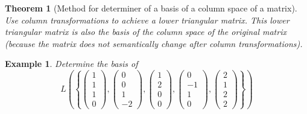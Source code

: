 \documentclass[a4paper,landscape,twocolumn]{article}
\newcommand\set[1]{\left\{#1\right\}}
\newtheorem{theorem}{Theorem}[section]
\newtheorem{ex}{Example}[section]
\begin{document}
\begin{theorem}[Method for determiner of a basis of a column space of a matrix]
  Use column transformations to achieve a lower triangular matrix.
  This lower triangular matrix is also the basis of the column space of the original matrix
  (because the matrix does not semantically change after column transformations).
\end{theorem}
\begin{ex}
  \label{beispiel-6.41}
  Determine the basis of
  \[
    L\left(\set{
      \begin{pmatrix} 1 \\ 1 \\ 1 \\ 0 \end{pmatrix},
      \begin{pmatrix} 0 \\ 0 \\ 1 \\ -2 \end{pmatrix},
      \begin{pmatrix} 1 \\ 2 \\ 0 \\ 0 \end{pmatrix},
      \begin{pmatrix} 0 \\ -1 \\ 1 \\ 0 \end{pmatrix},
      \begin{pmatrix} 2 \\ 1 \\ 2 \\ 2 \end{pmatrix}
    }\right)
  \]


\end{ex}
\end{document}
